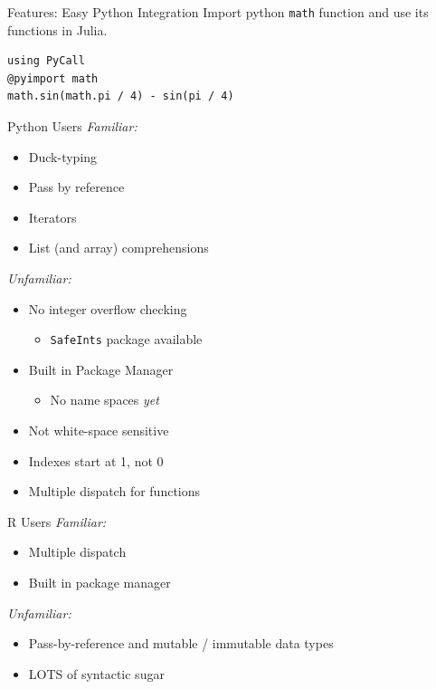 \documentclass[11pt]{beamer}
\begin{document}
\begin{frame}[fragile]{Features: Easy Python Integration}
Import python \texttt{math} function and use its functions in Julia.
\begin{verbatim}
using PyCall
@pyimport math
math.sin(math.pi / 4) - sin(pi / 4)
\end{verbatim}
\end{frame}

\begin{frame}[c]{Python Users}
\emph{Familiar:}
\begin{itemize}
    \item Duck-typing
    \item Pass by reference
    \item Iterators
    \item List (and array) comprehensions
\end{itemize}
\emph{Unfamiliar:}
\begin{itemize}
    \item No integer overflow checking
    \begin{itemize}
        \item \texttt{SafeInts} package available
    \end{itemize}
    \item Built in Package Manager
    \begin{itemize}
        \item No name spaces \emph{yet}
    \end{itemize}
    \item Not white-space sensitive
    \item Indexes start at 1, not 0
    \item Multiple dispatch for functions
\end{itemize}
\end{frame}

\begin{frame}[c]{R Users}
\emph{Familiar:}
\begin{itemize}
    \item Multiple dispatch
    \item Built in package manager
\end{itemize}
\emph{Unfamiliar:}
\begin{itemize}
    \begin{itemize}
        \item \texttt{SafeInts} package available
    \end{itemize}
    \item Pass-by-reference and mutable / immutable data types
    \item LOTS of syntactic sugar
\end{itemize}
\end{frame}
\end{document}
